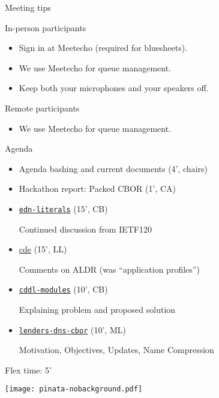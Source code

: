 \documentclass[aspectratio=169]{beamer}
\begin{document}
\begin{frame}{Meeting tips}
    \begin{block}{\small In-person participants}
      \begin{itemize}
        \item Sign in at Meetecho (required for bluesheets).
        \item We use Meetecho for queue management.
        \item Keep both your microphones and your speakers off.
      \end{itemize}
    \end{block}

    \begin{block}{\small Remote participants}
      \begin{itemize}
        \item We use Meetecho for queue management.
      \end{itemize}
    \end{block}
\end{frame}

\begin{frame}{Agenda}\large
    \begin{itemize}
        \item Agenda bashing and current documents (4', chairs)

        \item Hackathon report: Packed CBOR (1', CA)

        \item \href{https://datatracker.ietf.org/doc/draft-ietf-cbor-edn-literals/}{\texttt{edn-literals}} (15', CB)

            Continued discussion from IETF120

        \item  \href{https://datatracker.ietf.org/doc/draft-ietf-cbor-cde/}{cde} (15', LL)

            Comments on ALDR (was ``application profiles'')

        \item  \href{https://datatracker.ietf.org/doc/draft-ietf-cbor-cddl-modules/}{\texttt{cddl-modules}} (10', CB)

            Explaining problem and proposed solution

        \item  \href{https://datatracker.ietf.org/doc/draft-lenders-dns-cbor/}{\texttt{lenders-dns-cbor}} (10', ML)

            Motivation, Objectives, Updates, Name Compression
    \end{itemize}

    \bigskip

    Flex time: 5'

    \vspace{-3cm}
    \begin{block}{\texttt{[image: pinata-nobackground.pdf]}\mbox{\quad}}
    \end{block}
\end{frame}
\end{document}
